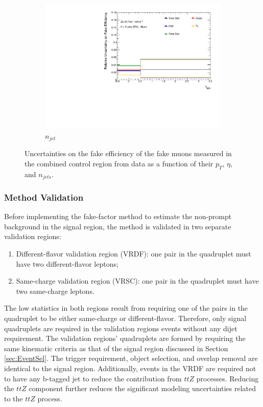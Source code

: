 \begin{figure}[!htbp]
\begin{center}
\begin{subfigure}{.49\textwidth}
        \includegraphics[width=.95\linewidth]{figures/Analysis/Background/SystematicUncertainties3D_Muon_njet.pdf}
        \caption{$n_{jet}$ \label{fig:FakeUnc_njet_mu}}
    \end{subfigure}
    \end{center}
\caption{Uncertainties on the fake efficiency of the fake muons measured in the combined control region from data as a function of their $p_{T}$, $\eta$, and $n_{jets}$. \label{fig:FakeEffUnc_3D_Muon}}
\end{figure}
\newpage
\subsubsection{Method Validation}
\label{subsubsec:Validation}
Before implementing the fake-factor method to estimate the non-prompt background in the signal region, the method is validated in two separate validation regions:
\begin{enumerate}
    \item{ Different-flavor validation region (VRDF): one pair in the quadruplet must have two different-flavor leptons;}
    \item{ Same-charge validation region (VRSC): one pair in the quadruplet must have two same-charge leptons.}
\end{enumerate}

The low statistics in both regions result from requiring one of the pairs in the quadruplet to be either same-charge or different-flavor. Therefore, only signal quadruplets are required in the validation regions events without any dijet requirement. The validation regions' quadruplets are formed by requiring the same kinematic criteria as that of the signal region discussed in Section \ref{sec:EventSel}. The trigger requirement, object selection, and overlap removal are identical to the signal region. Additionally, events in the VRDF are required not to have any b-tagged jet to reduce the contribution from $ttZ$ processes. Reducing the $ttZ$ component further reduces the significant modeling uncertainties related to the $ttZ$ process.

